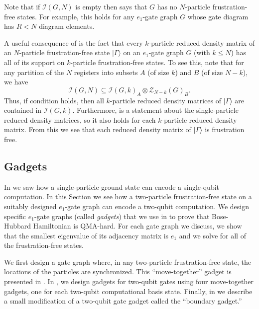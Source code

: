 \documentclass[../thesis-main/thesis-main]{subfiles}
\begin{document}
Note that if $\mathcal{I}(G,N)$ is empty then  says that $G$ has no $N$-particle frustration-free states. For example, this holds for any $e_{1}$-gate graph $G$ whose gate diagram has $R<N$ diagram elements.

A useful consequence of  is the fact that every $k$-particle reduced density matrix of an $N$-particle frustration-free state $|\Gamma\rangle$ on an $e_{1}$-gate graph $G$ (with $k\leq N$) has all of its support on $k$-particle frustration-free states. To see this, note that for any partition of the $N$ registers into subsets $A$ (of size $k$) and $B$ (of size $N-k$), we have
\[
\mathcal{I}(G,N)\subseteq\mathcal{I}(G,k)_{A}\otimes\mathcal{Z}_{N-k}(G)_{B}.
\]
Thus, if condition  holds, then all $k$-particle reduced density matrices of $|\Gamma\rangle$ are contained in $\mathcal{I}(G,k)$. Furthermore,  is a statement about the single-particle reduced density matrices, so it also holds for each $k$-particle reduced density matrix. From this we see that each reduced density matrix of $|\Gamma\rangle$ is frustration free.


\subsection{Gadgets}

In  we saw how a single-particle ground state can encode a single-qubit computation. In this Section we see how a two-particle frustration-free state on a suitably designed $e_{1}$-gate graph can encode a two-qubit computation. We design specific $e_{1}$-gate graphs (called \emph{gadgets}) that we use in  to prove that Bose-Hubbard Hamiltonian is QMA-hard. For each gate graph we discuss, we show that the smallest eigenvalue of its adjacency matrix is $e_{1}$ and we solve for all of the frustration-free states.

We first design a gate graph where, in any two-particle frustration-free state, the locations of the particles are synchronized. This ``move-together'' gadget is presented in . In , we design gadgets for two-qubit gates using four move-together gadgets, one for each two-qubit computational basis state. Finally, in  we describe a small modification of a two-qubit gate gadget called the ``boundary gadget.''
\end{document}

